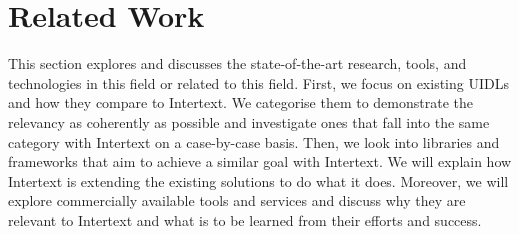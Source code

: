 
\chapter{Related Work} \label{relatedWork}

This section explores and discusses the state-of-the-art research, tools, and technologies in this field or related to this field. First, we focus on existing UIDLs and how they compare to Intertext. We categorise them to demonstrate the relevancy as coherently as possible and investigate ones that fall into the same category with Intertext on a case-by-case basis. Then, we look into libraries and frameworks that aim to achieve a similar goal with Intertext. We will explain how Intertext is extending the existing solutions to do what it does. Moreover, we will explore commercially available tools and services and discuss why they are relevant to Intertext and what is to be learned from their efforts and success.








